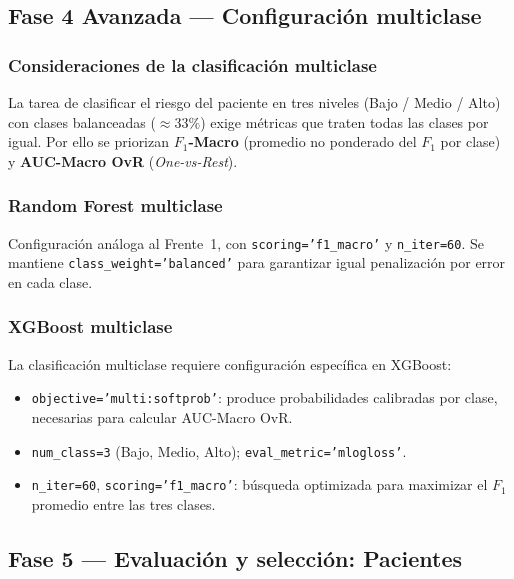 \documentclass[12pt, a4paper]{article}
\begin{document}
\subsection{Fase 4 Avanzada --- Configuraci\'on multiclase}

\subsubsection{Consideraciones de la clasificaci\'on multiclase}

La tarea de clasificar el riesgo del paciente en tres niveles (Bajo / Medio / Alto) con clases balanceadas ($\approx 33\%$) exige m\'etricas que traten todas las clases por igual. Por ello se priorizan \textbf{$F_1$-Macro} (promedio no ponderado del $F_1$ por clase) y \textbf{AUC-Macro OvR} (\textit{One-vs-Rest}).

\subsubsection{Random Forest multiclase}

Configuraci\'on an\'aloga al Frente~1, con \texttt{scoring=\allowbreak'f1\_macro'} y \texttt{n\_iter=60}. Se mantiene \texttt{class\_weight=\allowbreak'balanced'} para garantizar igual penalizaci\'on por error en cada clase.

\subsubsection{XGBoost multiclase}

La clasificaci\'on multiclase requiere configuraci\'on espec\'ifica en XGBoost:

\begin{itemize}[leftmargin=1.5em, itemsep=2pt]
  \item \texttt{objective=\allowbreak'multi:softprob'}: produce probabilidades calibradas por clase, necesarias para calcular AUC-Macro OvR.
  \item \texttt{num\_class=3} (Bajo, Medio, Alto); \quad \texttt{eval\_metric=\allowbreak'mlogloss'}.
  \item \texttt{n\_iter=60}, \texttt{scoring=\allowbreak'f1\_macro'}: b\'usqueda optimizada para maximizar el $F_1$ promedio entre las tres clases.
\end{itemize}

\subsection{Fase 5 --- Evaluaci\'on y selecci\'on: Pacientes}
\end{document}
